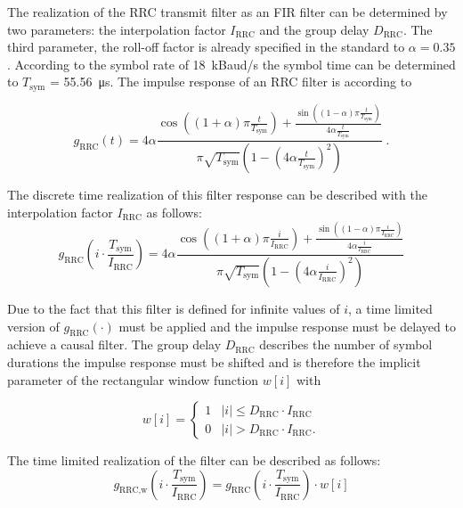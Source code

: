 The realization of the \ac{RRC} transmit filter as an \ac{FIR} filter can be determined by two parameters: the interpolation factor $I_\text{RRC}$ and the group delay $D_\text{RRC}$. The third parameter, the roll-off factor is already specified in the standard to $\alpha = 0.35$.  According to the symbol rate of \SI{18}{kBaud/s} the symbol time can be determined to $T_\text{sym}$ = \SI{55.56}{\micro s}. The impulse response of an \ac{RRC} filter is according to \cite{Kammeyer}

\begin{equation}
g_\text{RRC}(t) = 4 \alpha \frac{\cos \left((1+\alpha)\pi \frac{t}{T_\text{sym}} \right) + \frac{\sin \left( (1-\alpha)\pi \frac{t}{T_\text{sym}}\right)}{4 \alpha \frac{t}{T_\text{sym}}}}{\pi \sqrt{T_\text{sym}} \left(1-\left(4 \alpha \frac{t}{T_\text{sym}} \right)^2 \right)}\;.
\label{eq:g_rrc_t}
\end{equation}

The discrete time realization of this filter response can be described with the interpolation factor $I_\text{RRC}$ as follows:
\begin{equation}
g_\text{RRC}\left( i \cdot \frac{T_\text{sym}}{I_\text{RRC}} \right) = 4 \alpha \frac{\cos \left((1+\alpha)\pi \frac{i}{I_\text{RRC}} \right) + \frac{\sin \left( (1-\alpha)\pi \frac{i}{I_\text{RRC}}\right)}{4 \alpha \frac{i}{I_\text{RRC}}}}{\pi \sqrt{T_\text{sym}} \left(1-\left(4 \alpha \frac{i}{I_\text{RRC}} \right)^2 \right)}
\end{equation}

Due to the fact that this filter is defined for infinite values of $i$, a time limited version of $g_\text{RRC}(\cdot)$ must be applied and the impulse response must be delayed to achieve a causal filter. The group delay $D_\text{RRC}$ describes the number of symbol durations the impulse response must be shifted and is therefore the implicit parameter of the rectangular window function $w[i]$ with

\begin{equation}
w[i] = \begin{cases}
1 & \left |i  \right | \leq D_\text{RRC} \cdot I_\text{RRC} \\
0 & \left |i  \right | > D_\text{RRC} \cdot I_\text{RRC}.
\end{cases}
\end{equation}

The time limited realization of the filter can be described as follows:
\begin{equation}
g_\text{RRC,w}\left( i \cdot \frac{T_\text{sym}}{I_\text{RRC}} \right) = g_\text{RRC}\left( i \cdot \frac{T_\text{sym}}{I_\text{RRC}} \right) \cdot w[i]
\end{equation}

